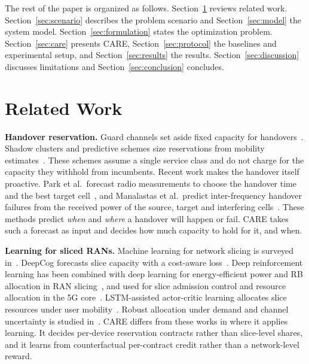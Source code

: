 \documentclass[conference]{IEEEtran}
\begin{document}
The rest of the paper is organized as follows. Section~\ref{sec:related} reviews related work. Section~\ref{sec:scenario} describes the problem scenario and Section~\ref{sec:model} the system model. Section~\ref{sec:formulation} states the optimization problem. Section~\ref{sec:care} presents CARE, Section~\ref{sec:protocol} the baselines and experimental setup, and Section~\ref{sec:results} the results. Section~\ref{sec:discussion} discusses limitations and Section~\ref{sec:conclusion} concludes.

\section{Related Work}\label{sec:related}
\textbf{Handover reservation.} Guard channels set aside fixed capacity for handovers~\cite{hong1986guard}. Shadow clusters and predictive schemes size reservations from mobility estimates~\cite{levine1997shadow,choi1998predictive}. These schemes assume a single service class and do not charge for the capacity they withhold from incumbents. Recent work makes the handover itself proactive. Park et al.\ forecast radio measurements to choose the handover time and the best target cell~\cite{park2024proactive}, and Manalastas et al.\ predict inter-frequency handover failures from the received power of the source, target and interfering cells~\cite{manalastas2023hofailure}. These methods predict \emph{when} and \emph{where} a handover will happen or fail. CARE takes such a forecast as input and decides how much capacity to hold for it, and when.

\textbf{Learning for sliced RANs.} Machine learning for network slicing is surveyed in~\cite{phyu2023mlslicing}. DeepCog forecasts slice capacity with a cost-aware loss~\cite{bega2020deepcog}. Deep reinforcement learning has been combined with deep learning for energy-efficient power and RB allocation in RAN slicing~\cite{azimi2022drlslicing}, and used for slice admission control and resource allocation in the 5G core~\cite{villota2022admission}. LSTM-assisted actor-critic learning allocates slice resources under user mobility~\cite{li2020mobility}. Robust allocation under demand and channel uncertainty is studied in~\cite{gharehgoli2023uncertainty}. CARE differs from these works in where it applies learning. It decides per-device reservation contracts rather than slice-level shares, and it learns from counterfactual per-contract credit rather than a network-level reward.
\end{document}

